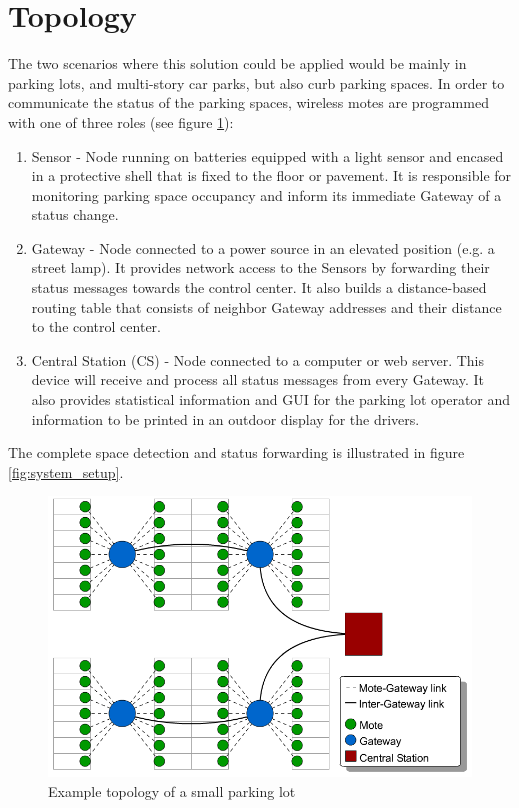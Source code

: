 \section{Topology}
\label{sec:topology}
The two scenarios where this solution could be applied would be mainly in parking lots, and multi-story car parks, but also curb parking spaces.
In order to communicate the status of the parking spaces, wireless motes are programmed with one of three roles (see figure \ref{fig:topology}):
\begin{enumerate}
	\item Sensor - Node running on batteries equipped with a light sensor and encased in a protective shell that is fixed to the floor or pavement.
	It is responsible for monitoring parking space occupancy and inform its immediate Gateway of a status change.
	\item Gateway - Node connected to a power source in an elevated position (e.g. a street lamp). 
	It provides network access to the Sensors by forwarding their status messages towards the control center. 
	It also builds a distance-based routing table that consists of neighbor Gateway addresses and their distance to the control center.
	\item Central Station (CS) - Node connected to a computer or web server. This device will receive and process all status messages from every Gateway. 
	It also provides statistical information and GUI for the parking lot operator and information to be printed in an outdoor display for the drivers.
\end{enumerate}
The complete space detection and status forwarding is illustrated in figure \ref{fig:system_setup}.

\begin{figure}
    \centering
    \includegraphics[width=15cm]{images/General_ParkingLotTopology.png}
	\vspace{-1.5em}
    \caption{Example topology of a small parking lot}
    \vspace{-1.5em}
    \label{fig:topology}
\end{figure}

